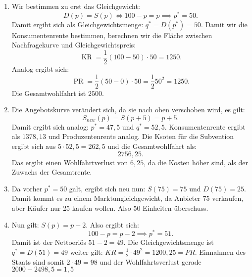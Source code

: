 \begin{solution}
	\begin{enumerate}
		\item Wir bestimmen zu erst das Gleichgewicht:
		      \[
			      D(p) = S(p) \iff 100-p = p \implies p^* = 50
			      .\]
		      Damit ergibt sich als Gleichgewichtsmenge: $q^*= D(p^*) = 50$. Damit wir die Konsumentenrente bestimmen, berechnen wir die Fläche zwischen Nachfragekurve und Gleichgewichtspreis:
		      \[
			      \operatorname{KR} = \frac{1}{2} (100-50) \cdot 50 = 1250
			      .\]
		      Analog ergibt sich:
		      \[
			      \operatorname{PR} = \frac{1}{2} (50-0) \cdot 50= \frac{1}{2} 50^2 = 1250
			      .\]
		      Die Gesamtwohlfahrt ist $2500$.
		\item Die Angebotskurve verändert sich, da sie nach oben verschoben wird, es gilt:
		      \[
			      S_{new}(p) = S(p+5) = p+5
			      .\]
		      Damit ergibt sich analog: $p^* = 47,5$ und $q^* = 52,5$.
		      Konsumentenrente ergibt  als $1378,13$ und Produzentenrente analog.
		      Die Ksoten für die Subvention ergibt sich aus $5 \cdot 52,5 = 262,5$ und die Gesamtwohlfahrt als:
		      \[
			      2756,25
			      .\]
		      Das ergibt einen Wohlfahrtverlust von $6,25$, da die Kosten höher sind, als der Zuwachs der Gesamtrente.
		\item Da vorher $p^* = 50$ galt, ergibt sich neu nun: $S(75) = 75$ und $D(75) = 25$. Damit kommt es zu einem Marktungleichgewicht, da Anbieter 75 verkaufen, aber Käufer nur 25 kaufen wollen. Also 50 Einheiten überschuss.
		\item Nun gilt: $S(p) = p-2$. Also ergibt sich:
		      \[
			      100-p = p-2 \implies p^* = 51
			      .\]
		      Damit ist der Nettoerlös $51-2=49$. Die Gleichgewichtsmenge ist $q^* = D(51) = 49$
		      weiter gilt: $KR= \frac{1}{2}\cdot 49^2 = 1200,25 = PR$.  Einnahmen des Staats sind somit $2\cdot 49 = 98$ und der Wohlfahrtsverlust gerade $2000-2498,5 = 1,5$
	\end{enumerate}
\end{solution}



